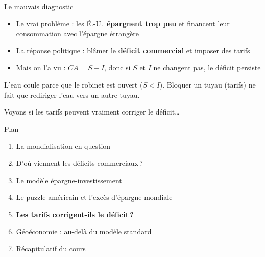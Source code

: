 \documentclass[aspectratio=169]{beamer}
\begin{document}
\begin{frame}[t]{Le mauvais diagnostic}\examtag
   \small
   \vspace{0.2cm}
   \begin{itemize}
      \setlength\itemsep{0.3cm}
      \item Le vrai problème : les É.-U.\ \textbf{épargnent trop peu} et financent leur consommation avec l'épargne étrangère
      \item La réponse politique : blâmer le \textbf{déficit commercial} et imposer des tarifs
      \item Mais on l'a vu : $CA = S - I$, donc si $S$ et $I$ ne changent pas, le déficit persiste
   \end{itemize}
   \vspace{0.2cm}
   \begin{warning}
      \footnotesize
      L'eau coule parce que le robinet est ouvert ($S < I$). Bloquer un tuyau (tarifs) ne fait que rediriger l'eau vers un autre tuyau.
   \end{warning}
   \vspace{0.3cm}
   \centering
   {\small\textcolor{HECgray}{Voyons si les tarifs peuvent vraiment corriger le déficit\ldots}}
\end{frame}


\begin{frame}{Plan}
   \begin{enumerate}
      \setlength\itemsep{0.4cm}
      \item {\color{gray!50}La mondialisation en question}
      \item {\color{gray!50}D'où viennent les déficits commerciaux\,?}
      \item {\color{gray!50}Le modèle épargne-investissement}
      \item {\color{gray!50}Le puzzle américain et l'excès d'épargne mondiale}
      \item \textbf{Les tarifs corrigent-ils le déficit\,?}
      \item Géoéconomie : au-delà du modèle standard
      \item Récapitulatif du cours
   \end{enumerate}
\end{frame}

\end{document}
